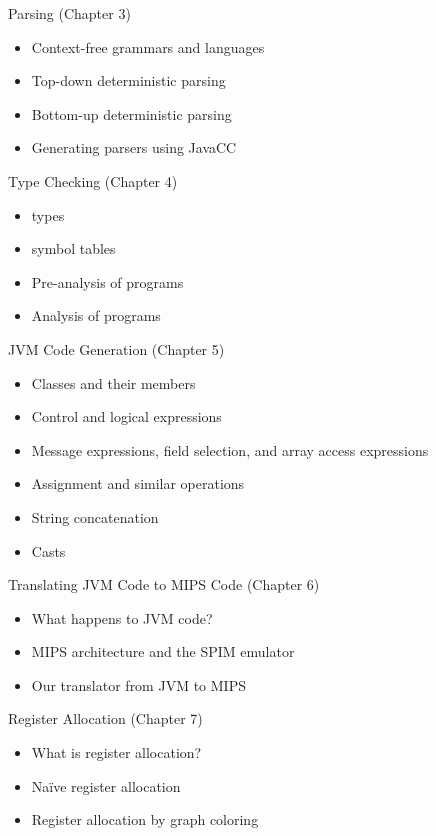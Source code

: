 \documentclass[8pt,a4paper,compress]{beamer}
\begin{document}
\begin{frame}[fragile]
\pause

Parsing (Chapter 3)
\begin{itemize}
\item Context-free grammars and languages
\item Top-down deterministic parsing
\item Bottom-up deterministic parsing
\item Generating parsers using JavaCC
\end{itemize}

\pause
\bigskip

Type Checking (Chapter 4)
\begin{itemize}
\item \jmm types
\item \jmm symbol tables
\item Pre-analysis of \jmm programs
\item Analysis of \jmm programs
\end{itemize}
\end{frame}

\begin{frame}[fragile]
\pause

JVM Code Generation (Chapter 5)
\begin{itemize}
\item Classes and their members
\item Control and logical expressions
\item Message expressions, field selection, and array access expressions
\item Assignment and similar operations
\item String concatenation
\item Casts
\end{itemize}

\pause
\bigskip

Translating JVM Code to MIPS Code (Chapter 6)
\begin{itemize}
\item What happens to JVM code?
\item MIPS architecture and the SPIM emulator
\item Our translator from JVM to MIPS
\end{itemize}

\pause
\bigskip

Register Allocation (Chapter 7)
\begin{itemize}
\item What is register allocation?
\item Na\"{i}ve register allocation
\item Register allocation by graph coloring
\end{itemize}
\end{frame}
\end{document}
